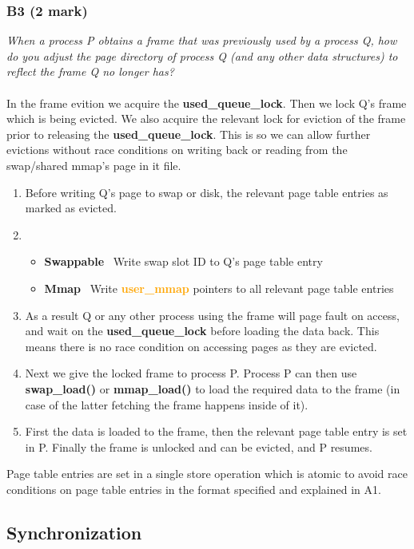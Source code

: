 \documentclass{report}
\newcommand{\question}[1]{\textit{#1} \ }
\newcommand{\bullpara}[2]{\item \textbf{#1} \ #2}
\newcommand{\fun}[1]{\textcolor{Emerald}{\textbf{#1}}}
\newcommand{\struct}[1]{\textcolor{orange}{\textbf{#1}}}
\newcommand{\var}[1]{\textcolor{RoyalPurple}{\textbf{#1}}}
\newcommand{\compitem}[1]{\begin{itemize}\setlength\itemsep{-0.1em}#1\end{itemize}}
\newcommand{\compenum}[1]{\begin{enumerate}\setlength\itemsep{-0.1em}#1\end{enumerate}}
\begin{document}
			\subsubsection*{B3 (2 mark)}
				\question{When a process P obtains a frame that was previously 
				used by a process Q, how do you adjust the page directory of
				process Q (and any other data structures) to reflect the frame 
				Q no longer has?}
				\\
				\\ In the frame evition we acquire the \var{used\_queue\_lock}.
				Then we lock Q's frame which is being evicted.
				We also acquire the relevant lock for eviction of the frame 
				prior to releasing the \var{used\_queue\_lock}. This is so we 
				can allow further evictions without race conditions on writing 
				back or reading from the swap/shared mmap's page in it file.
				
				\compenum {
					\item Before writing Q's page to swap or disk, 
					the relevant page table entries as marked as evicted.
					\item \compitem{
						\bullpara{Swappable}
						{Write swap slot ID to Q's page table entry}
						\bullpara{Mmap}
						{Write \struct{user\_mmap} pointers to all relevant page
						table entries}}
					\item As a result Q or any other process using the frame 
						will page fault on access, and wait on the 
						\var{used\_queue\_lock} before loading the data back.
						This means there is no race condition on accessing
						pages as they are evicted.
					\item Next we give the locked frame to process P. Process P 
						can then use \fun{swap\_load()} or \fun{mmap\_load()} to 
						load the required data to the frame (in case of the latter
						fetching the frame happens inside of it).
					\item First the data is loaded to the frame, then the 
						relevant page table entry is set in P. Finally the frame
						is unlocked and can be evicted, and P resumes.
				}
				Page table entries are set in a single store operation which is 
				atomic to avoid race conditions on page table entries in the 
				format specified and explained in A1.

		\subsection*{Synchronization}
\end{document}
